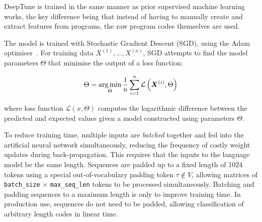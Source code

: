 DeepTune is trained in the same manner as prior supervised machine learning works, the key difference being that instead of having to manually create and extract features from programs, the raw program codes themselves are used.

The model is trained with Stochastic Gradient Descent (SGD), using the Adam optimiser~\cite{Kingma2015}. For training data $X^{(1)}, \ldots, X^{(n)}$, SGD attempts to find the model parameters $\Theta$ that minimise the output of a loss function:

\begin{equation}
\Theta = \operatorname*{arg\,min}_{\Theta} \frac{1}{n} \sum_{i=1}^{n} \mathcal{L} \left( \bm{X}^{(i)}, \Theta \right)
\end{equation}

where loss function $\mathcal{L} \left(x, \Theta \right)$ computes the logarithmic difference between the predicted and expected values given a model constructed using parameters $\Theta$.

To reduce training time, multiple inputs are \emph{batched} together and fed into the artificial neural network simultaneously, reducing the frequency of costly weight updates during back-propagation. This requires that the inputs to the language model be the same length. Sequences are padded up to a fixed length of 1024 tokens using a special out-of-vocabulary padding token $\tau \not\in V$, allowing matrices of \texttt{batch\_size} $\times$ \texttt{max\_seq\_len} tokens to be processed simultaneously. Batching and padding sequences to a maximum length is only to improve training time. In production use, sequences do not need to be padded, allowing classification of arbitrary length codes in linear time.
